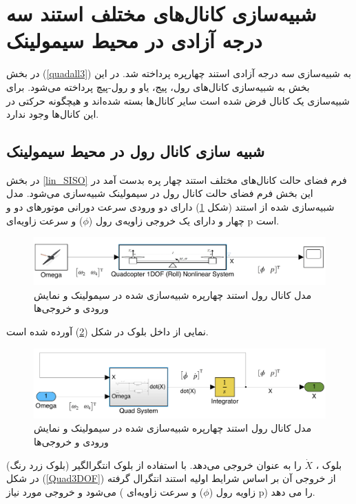 \section{شبیه‌سازی کانال‌های مختلف استند سه درجه آزادی در محیط سیمولینک}
 در بخش
(\ref{quadall3})
 به شبیه‌سازی سه درجه آزادی استند چهارپره پرداخته شد. در این بخش به شبیه‌سازی کانال‌های رول، پیج، یاو و رول-پیچ پرداخته می‌شود. برای شبیه‌سازی یک کانال فرض شده است سایر کانال‌ها بسته شده‌اند و هیچگونه حرکتی در این کانال‌ها وجود ندارد.
 
\subsection{شبیه سازی کانال رول در محیط سیمولینک}
در بخش
\ref{lin_SISO}
فرم فضای حالت کانال‌های مختلف استند چهار پره بدست آمد در این بخش فرم فضای حالت کانال رول در سیمولینک شبیه‌سازی می‌شود.
مدل شبیه‌سازی شده از استند (شکل \ref{roll_simulink}) دارای دو ورودی سرعت دورانی موتورهای دو و چهار  و دارای یک خروجی زاویه‌ی رول ($\phi$) و  سرعت زاویه‌ای p است.
\begin{figure}[H]
	\includegraphics[width=16cm]{../../Figures/QuadSimulation/roll_Stand_Model.png}
	\centering
	\vspace*{-15mm}
	\caption{مدل کانال رول استند چهارپره شبیه‌سازی شده در سیمولینک و نمایش ورودی و خروجی‌ها}
	\label{roll_simulink}
\end{figure}

نمایی از داخل بلوک
در شکل (\ref{Quad1DOF_roll}) آورده شده است.
\begin{figure}[H]
	\includegraphics[width=16cm]{../../Figures/QuadSimulation/roll_Integrator.png}
	\centering
	\vspace*{-15mm}
	\caption{مدل کانال رول استند چهارپره شبیه‌سازی شده در سیمولینک و نمایش ورودی و خروجی‌ها}
	\label{Quad1DOF_roll}
\end{figure}
بلوک
،
$\dot X$ را به عنوان خروجی می‌دهد. با استفاده از بلوک انتگرالگیر (بلوک زرد رنگ) در شکل
(\ref{Quad3DOF})
از خروجی آن بر اساس شرایط اولیه استند انتگرال گرفته می‌شود و خروجی مورد نیاز ( زاویه رول ($\phi$) و سرعت زاویه‌ای‌
p)
را می دهد.

